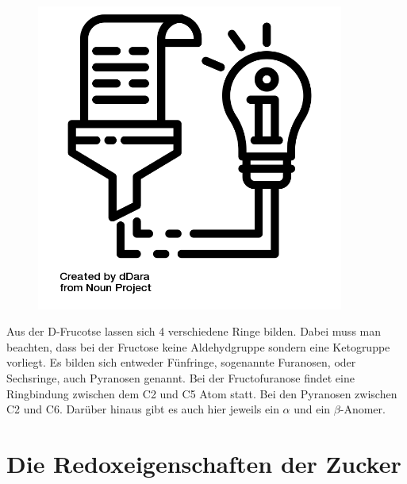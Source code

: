 \documentclass{scrartcl}  %
\begin{document}
			\begin{tcolorbox}[enhanced,
				colback=white,
				colframe=darkgray,
				fonttitle=\sffamily\bfseries\large, 
				title=Die Ringe der Fructose,  %
				attach boxed title to top left={xshift=3.2mm,yshift=-0.50mm},
				boxed title style={skin=enhancedfirst jigsaw,size=small,arc=1mm,bottom=-1mm,colframe=darkgray,height=0.75cm},
				colbacktitle=darkgray,
				drop lifted shadow]
				\begin{figure}  
					\centering
					\vspace{-14pt}  %
					\includegraphics[width=0.9\textwidth]{symbols/symbol_tex_content}
				\end{figure}
				
				Aus der D-Frucotse lassen sich 4 verschiedene Ringe bilden. Dabei muss man beachten, dass bei der Fructose keine Aldehydgruppe sondern eine Ketogruppe vorliegt. \newline
				Es bilden sich entweder Fünfringe, sogenannte Furanosen, oder Sechsringe, auch Pyranosen genannt. Bei der Fructofuranose findet eine Ringbindung zwischen dem C2 und C5 Atom statt. Bei den Pyranosen zwischen C2 und C6. Darüber hinaus gibt es auch hier jeweils ein $\alpha$ und ein $\beta$-Anomer.		
			\end{tcolorbox}			
			
\newpage
	\section{Die Redoxeigenschaften der Zucker}
	
\end{document}
